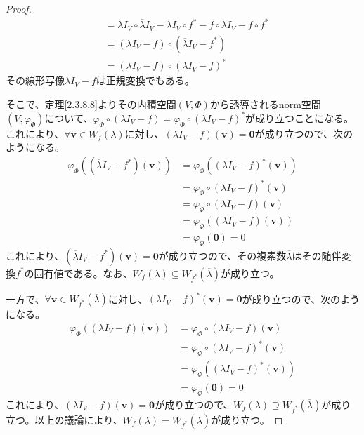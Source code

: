 \documentclass[dvipdfmx]{jsarticle}
\begin{document}
\begin{proof}
\begin{align*}
&= \lambda I_{V} \circ \overline{\lambda}I_{V} - \lambda I_{V} \circ f^{*} - f \circ \lambda I_{V} - f \circ f^{*}\\
&= \left( \lambda I_{V} - f \right) \circ \left( \overline{\lambda}I_{V} - f^{*} \right)\\
&= \left( \lambda I_{V} - f \right) \circ \left( \lambda I_{V} - f \right)^{*}
\end{align*}
その線形写像$\lambda I_{V} - f$は正規変換でもある。\par
そこで、定理\ref{2.3.8.8}よりその内積空間$(V,\varPhi)$から誘導されるnorm空間$\left( V,\varphi_{\varPhi} \right)$について、$\varphi_{\varPhi} \circ \left( \lambda I_{V} - f \right) = \varphi_{\varPhi} \circ \left( \lambda I_{V} - f \right)^{*}$が成り立つことになる。これにより、$\forall\mathbf{v} \in W_{f}(\lambda)$に対し、$\left( \lambda I_{V} - f \right)\left( \mathbf{v} \right) = \mathbf{0}$が成り立つので、次のようになる。
\begin{align*}
\varphi_{\varPhi}\left( \left( \overline{\lambda}I_{V} - f^{*} \right)\left( \mathbf{v} \right) \right) &= \varphi_{\varPhi}\left( \left( \lambda I_{V} - f \right)^{*}\left( \mathbf{v} \right) \right)\\
&= \varphi_{\varPhi} \circ \left( \lambda I_{V} - f \right)^{*}\left( \mathbf{v} \right)\\
&= \varphi_{\varPhi} \circ \left( \lambda I_{V} - f \right)\left( \mathbf{v} \right)\\
&= \varphi_{\varPhi}\left( \left( \lambda I_{V} - f \right)\left( \mathbf{v} \right) \right)\\
&= \varphi_{\varPhi}\left( \mathbf{0} \right) = 0
\end{align*}
これにより、$\left( \overline{\lambda}I_{V} - f^{*} \right)\left( \mathbf{v} \right) = \mathbf{0}$が成り立つので、その複素数$\overline{\lambda}$はその随伴変換$f^{*}$の固有値である。なお、$W_{f}(\lambda) \subseteq W_{f^{*}}\left( \overline{\lambda} \right)$が成り立つ。\par
一方で、$\forall\mathbf{v} \in W_{f^{*}}\left( \overline{\lambda} \right)$に対し、$\left( \lambda I_{V} - f \right)^{*}\left( \mathbf{v} \right) = \mathbf{0}$が成り立つので、次のようになる。
\begin{align*}
\varphi_{\varPhi}\left( \left( \lambda I_{V} - f \right)\left( \mathbf{v} \right) \right) &= \varphi_{\varPhi} \circ \left( \lambda I_{V} - f \right)\left( \mathbf{v} \right)\\
&= \varphi_{\varPhi} \circ \left( \lambda I_{V} - f \right)^{*}\left( \mathbf{v} \right)\\
&= \varphi_{\varPhi}\left( \left( \lambda I_{V} - f \right)^{*}\left( \mathbf{v} \right) \right)\\
&= \varphi_{\varPhi}\left( \mathbf{0} \right) = 0
\end{align*}
これにより、$\left( \lambda I_{V} - f \right)\left( \mathbf{v} \right) = \mathbf{0}$が成り立つので、$W_{f}(\lambda) \supseteq W_{f^{*}}\left( \overline{\lambda} \right)$が成り立つ。以上の議論により、$W_{f}(\lambda) = W_{f^{*}}\left( \overline{\lambda} \right)$が成り立つ。
\end{proof}
\end{document}
